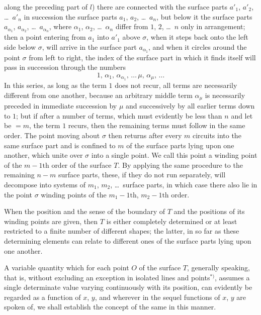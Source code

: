 \documentclass{article}
\begin{document}
along the preceding part of $l$) there are connected with the surface parts $a'_{1}$, $a'_{2}$, \dots\ $a'_{n}$ in succession the surface parts $a_{1}$, $a_{2}$, \dots\ $a_{n}$, but below it the surface parts $a_{\alpha_1}$, $a_{\alpha_2}$, \dots\ $a_{\alpha_n}$, where $\alpha_1$, $\alpha_2$, \dots\ $\alpha_n$ differ from $1$, $2$, \dots\ $n$ only in arrangement; then a point entering from $a_1$ into $a'_1$ above $\sigma$, when it steps back onto the left side below $\sigma$, will arrive in the surface part $a_{\alpha_1}$, and when it circles around the point $\sigma$ from left to right, the index of the surface part in which it finds itself will pass in succession through the numbers
\[
1, \, \alpha_1, \, \alpha_{\alpha_1}, \, \dots \, \mu, \, \alpha_\mu, \, \dots
\]
In this series, as long as the term $1$ does not recur, all terms are necessarily different from one another, because an arbitrary middle term $\alpha_\mu$ is necessarily preceded in immediate succession by $\mu$ and successively by all earlier terms down to $1$; but if after a number of terms, which must evidently be less than $n$ and let be $= m$, the term $1$ recurs, then the remaining terms must follow in the same order. The point moving about $\sigma$ then returns after every $m$ circuits into the same surface part and is confined to $m$ of the surface parts lying upon one another, which unite over $\sigma$ into a single point. We call this point a winding point of the $m-1\text{th}$ order of the surface $T$. By applying the same procedure to the remaining $n-m$ surface parts, these, if they do not run separately, will decompose into systems of $m_1$, $m_2$, \dots\ surface parts, in which case there also lie in the point $\sigma$ winding points of the $m_1-1\text{th}$, $m_2-1\text{th}$ order.

When the position and the sense of the boundary of $T$ and the positions of its winding points are given, then $T$ is either completely determined or at least restricted to a finite number of different shapes; the latter, in so far as these determining elements can relate to different ones of the surface parts lying upon one another.

A variable quantity which for each point $O$ of the surface $T$, generally speaking, that is, without excluding an exception in isolated lines and points${}^{*)}$, assumes a single determinate value varying continuously with its position, can evidently be regarded as a function of $x$, $y$, and wherever in the sequel functions of $x$, $y$ are spoken of, we shall establish the concept of the same in this manner.
\end{document}
